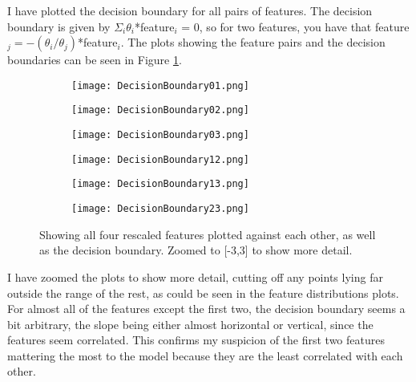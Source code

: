 

I have plotted the decision boundary for all pairs of features. 
The decision boundary is given by $\Sigma_i \theta_i$*feature$_i$ = 0, so for two features, you have that feature$_j = -(\theta_i/\theta_j)$*feature$_i$.
The plots showing the feature pairs and the decision boundaries can be seen in Figure \ref{fig:DB}.

\begin{figure}[ht!]
\begin{center}
        \begin{subfigure}{.49\textwidth}
      \centering
      \texttt{[image: DecisionBoundary01.png]}
    \end{subfigure}
    \begin{subfigure}{.49\textwidth}
      \centering
      \texttt{[image: DecisionBoundary02.png]}
    \end{subfigure}
    \begin{subfigure}{.49\textwidth}
      \centering
      \texttt{[image: DecisionBoundary03.png]}
    \end{subfigure}
    \begin{subfigure}{.49\textwidth}
      \centering
      \texttt{[image: DecisionBoundary12.png]}
    \end{subfigure}
    \begin{subfigure}{.49\textwidth}
      \centering
      \texttt{[image: DecisionBoundary13.png]}
    \end{subfigure}
    \begin{subfigure}{.49\textwidth}
      \centering
      \texttt{[image: DecisionBoundary23.png]}
    \end{subfigure}
    \caption{Showing all four rescaled features plotted against each other, as well as the decision boundary. Zoomed to [-3,3] to show more detail.}
    \label{fig:DB}
\end{center}
\end{figure}


I have zoomed the plots to show more detail, cutting off any points lying far outside the range of the rest, as could be seen in the feature distributions plots.
For almost all of the features except the first two, the decision boundary seems a bit arbitrary, the slope being either almost horizontal or vertical, since the features seem correlated. 
This confirms my suspicion of the first two features mattering the most to the model because they are the least correlated with each other.



















